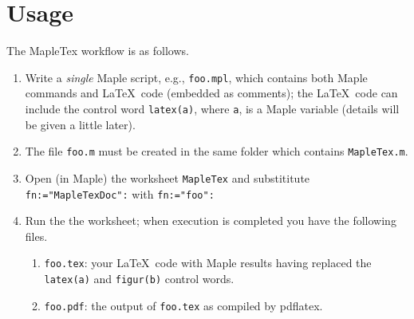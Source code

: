 \documentclass{article}
\begin{document}
 \section{Usage}
 The \textsf{MapleTex} workflow is as follows. 
 \begin{enumerate}
 \item Write a \emph{single} \textsf{Maple} script, e.g., \texttt{foo.mpl}, 
 which contains both \textsf{Maple} commands and \LaTeX\  code (embedded as comments);
 the \LaTeX\  code can include the control word \texttt{latex(a)}, where \texttt{a}, 
 is a \textsf{Maple} variable (details will be given a little later).     
 \item The file \texttt{foo.m} must be created in the same folder which contains \texttt{MapleTex.m}.
 \item Open (in \textsf{Maple}) the worksheet \texttt{MapleTex} and substititute 
 \texttt{fn:="MapleTexDoc":} with \texttt{fn:="foo":} 
 \item Run the the worksheet; when execution is completed you have the following files.
 \begin{enumerate}  
 \item \texttt{foo.tex}: your \LaTeX\  code with \textsf{Maple} results having replaced
 the \texttt{latex(a)} and \texttt{figur(b)} control words.
 \item \texttt{foo.pdf}: the output of \texttt{foo.tex} as compiled by \textsf{pdflatex}.
 \end{enumerate}
 \end{enumerate}
\end{document}
